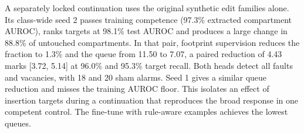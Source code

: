 A separately locked continuation uses the original synthetic edit families alone. Its class-wide seed 2 passes training competence (97.3\% extracted compartment AUROC), ranks targets at 98.1\% test AUROC and produces a large change in 88.8\% of untouched compartments. In that pair, footprint supervision reduces the fraction to 1.3\% and the queue from 11.50 to 7.07, a paired reduction of 4.43 marks [3.72, 5.14] at 96.0\% and 95.3\% target recall. Both heads detect all faults and vacancies, with 18 and 20 sham alarms. Seed 1 gives a similar queue reduction and misses the training AUROC floor. This isolates an effect of insertion targets during a continuation that reproduces the broad response in one competent control. The fine-tune with rule-aware examples achieves the lowest queues.
